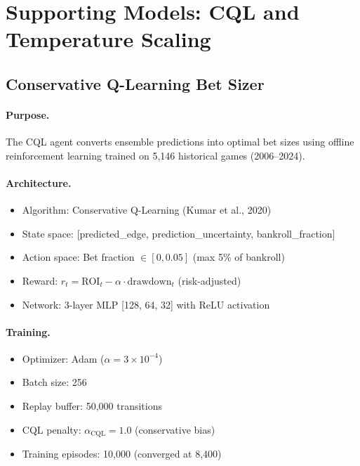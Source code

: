 \section{Supporting Models: CQL and Temperature Scaling}
\label{sec:supporting-models}

\subsection{Conservative Q-Learning Bet Sizer}

\paragraph{Purpose.}
The CQL agent converts ensemble predictions into optimal bet sizes using offline reinforcement learning trained on 5,146 historical games (2006--2024).

\paragraph{Architecture.}
\begin{itemize}[itemsep=1pt,parsep=0pt]
    \item Algorithm: Conservative Q-Learning (Kumar et al., 2020)
    \item State space: [predicted\_edge, prediction\_uncertainty, bankroll\_fraction]
    \item Action space: Bet fraction $\in [0, 0.05]$ (max 5\% of bankroll)
    \item Reward: $r_t = \text{ROI}_t - \alpha \cdot \text{drawdown}_t$ (risk-adjusted)
    \item Network: 3-layer MLP [128, 64, 32] with ReLU activation
\end{itemize}

\paragraph{Training.}
\begin{itemize}[itemsep=1pt,parsep=0pt]
    \item Optimizer: Adam ($\alpha = 3 \times 10^{-4}$)
    \item Batch size: 256
    \item Replay buffer: 50,000 transitions
    \item CQL penalty: $\alpha_{\text{CQL}} = 1.0$ (conservative bias)
    \item Training episodes: 10,000 (converged at 8,400)
\end{itemize}

